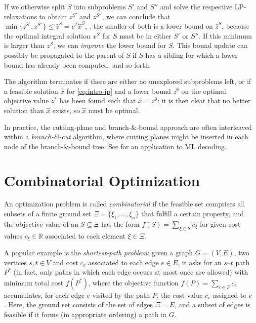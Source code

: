 If we otherwise split $S$ into subproblems $S'$ and $S''$ and solve the respective LP-relaxations to obtain $z^{S'}$ and $z^{S''}$, we can conclude that $\min\{z^{S'}, z^{S''}\} ≤ \hat z^S = c^T \hat x^S$, \ie, the smaller of both is a lower bound on $\hat z^S$, because the optimal integral solution $x^S$ for $S$ must be in either $S'$ or $S''$. If this minimum is larger than $z^S$, we can \emph{improve} the lower bound for $S$. This bound update can possibly be propagated to the parent of $S$ if $S$ has a sibling for which a lower bound has already been computed, and so forth.

The algorithm terminates if there are either no unexplored subproblems left, or if a feasible solution $\hat x$ for \cref{eq:intro-ip} and a lower bound $z^∅$ on the optimal objective value $z^*$ has been found such that $\hat x = z^∅$: it is then clear that no better solution than $\hat x$ exists, so $\hat x$ must be optimal.

In practice, the cutting-plane and branch-\&-bound approach are often interleaved within a \emph{branch-\&-cut} algorithm, where cutting planes might be inserted in each node of the branch-\&-bound tree. See \eg \cite{Helmling+14MLDecoding} for an application to ML decoding.

\section{Combinatorial Optimization}
\label{sec:intro-combopt}
An optimization problem is called \emph{combinatorial} if the feasible set comprises all subsets of a finite ground set $Ξ = \{ξ_1,\dotsc,ξ_n\}$ that fulfill a certain property, and the objective value of an $S ⊆ Ξ$ has the form $f(S) = \sum_{ξ ∈ S} c_ξ$ for given cost values $c_ξ ∈ ℝ$ associated to each element $ξ ∈ Ξ$.

A popular example is the \emph{shortest-path problem}: given a graph $G=(V,E)$, two vertices $s,t ∈ V$ and cost $c_e$ associated to each edge $e ∈ E$, it asks for an $s$–$t$ path $P^*$ (in fact, only paths in which each edge occurs at most once are allowed) with minimum total cost $f(P^*)$, where the objective function $f(P) = \sum_{e ∈ P} c_e$ accumulates, for each edge $e$ visited by the path $P$, the cost value $c_e$ assigned to $e$. Here, the ground set consists of the set of edges $Ξ=E$, and a subset of edges is feasible if it forms (in appropriate ordering) a path in $G$.

